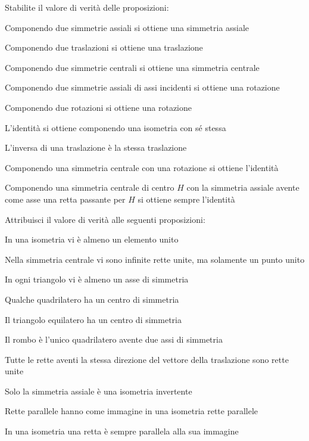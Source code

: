 \begin{esercizio}
\label{ese:8.86} %
Stabilite il valore di verità delle proposizioni:
\begin{enumeratea}
\item Componendo due simmetrie assiali si ottiene una simmetria 
assiale\hfill\boxV\quad\boxF
\item Componendo due traslazioni si ottiene una 
traslazione\hfill\boxV\quad\boxF
\item Componendo due simmetrie centrali si ottiene una simmetria 
centrale\hfill\boxV\quad\boxF
\item Componendo due simmetrie assiali di assi incidenti si ottiene 
una rotazione\hfill\boxV\quad\boxF
\item Componendo due rotazioni si ottiene una 
rotazione\hfill\boxV\quad\boxF
\item L'identità si ottiene componendo una isometria con sé 
stessa\hfill\boxV\quad\boxF
\item L'inversa di una traslazione è la stessa 
traslazione\hfill\boxV\quad\boxF
\item Componendo una simmetria centrale con una rotazione si ottiene 
l'identità\hfill\boxV\quad\boxF
\item Componendo una simmetria centrale di centro $H$ con la 
simmetria assiale avente come asse una retta passante per $H$ si 
ottiene sempre l'identità\hfill\boxV\quad\boxF
\end{enumeratea}
\end{esercizio}


\begin{esercizio}
\label{ese:8.90} %
Attribuisci il valore di verità alle seguenti proposizioni:
\begin{enumeratea}
\item In una isometria vi è almeno un elemento 
unito\hfill\boxV\quad\boxF
\item Nella simmetria centrale vi sono infinite rette unite, ma 
solamente un punto unito\tab\tab\hfill\boxV\quad\boxF
\item In ogni triangolo vi è almeno un asse di 
simmetria\hfill\boxV\quad\boxF
\item Qualche quadrilatero ha un centro di 
simmetria\hfill\boxV\quad\boxF
\item Il triangolo equilatero ha un centro di 
simmetria\hfill\boxV\quad\boxF
\item Il rombo è l'unico quadrilatero avente due assi di 
simmetria\hfill\boxV\quad\boxF
\item Tutte le rette aventi la stessa direzione del vettore della 
traslazione sono rette unite\tab\tab\hfill\boxV\quad\boxF
\item Solo la simmetria assiale è una isometria 
invertente\hfill\boxV\quad\boxF
\item Rette parallele hanno come immagine in una isometria rette 
parallele\hfill\boxV\quad\boxF
\item In una isometria una retta è sempre parallela alla sua 
immagine\hfill\boxV\quad\boxF
\end{enumeratea}
\end{esercizio}


